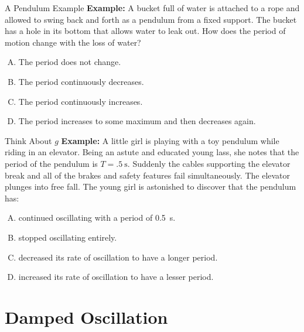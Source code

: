 \documentclass[12pt,compress,aspectratio=169]{beamer}
\begin{document}
\begin{frame}{A Pendulum Example}
  \textbf{Example:} A bucket full of water is attached to a rope and allowed
  to swing back and forth as a pendulum from a fixed support. The bucket has a
  hole in its bottom that allows water to leak out. How does the period of
  motion change with the loss of water?
  \begin{enumerate}[(A)]
  \item The period does not change.
  \item The period continuously decreases.
  \item The period continuously increases.
  \item The period increases to some maximum and then decreases again.
  \end{enumerate}
\end{frame}



\begin{frame}{Think About $g$}
  \textbf{Example:} A little girl is playing with a toy pendulum while riding
  in an elevator. Being an astute and educated young lass, she notes that the 
  period of the pendulum is $T=\SI{.5}\second$. Suddenly the cables
  supporting the elevator break and all  of the brakes and safety features fail
  simultaneously. The elevator plunges into free fall. The young girl is
  astonished to discover that the pendulum has:
  \begin{enumerate}[(A)]
  \item continued oscillating with a period of \SI{.5}\second.
  \item stopped oscillating entirely.
  \item decreased its rate of oscillation to have a longer period.
  \item increased its rate of oscillation to have a lesser period.
  \end{enumerate}
\end{frame}



\section{Damped Oscillation}
\end{document}
